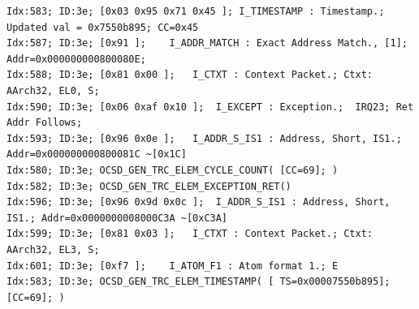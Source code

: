 \begin{latin}
\begin{lstlisting}
Idx:583; ID:3e; [0x03 0x95 0x71 0x45 ];	I_TIMESTAMP : Timestamp.; Updated val = 0x7550b895; CC=0x45
Idx:587; ID:3e; [0x91 ];	I_ADDR_MATCH : Exact Address Match., [1]; Addr=0x000000000800080E; 
Idx:588; ID:3e; [0x81 0x00 ];	I_CTXT : Context Packet.; Ctxt: AArch32, EL0, S; 
Idx:590; ID:3e; [0x06 0xaf 0x10 ];	I_EXCEPT : Exception.;  IRQ23; Ret Addr Follows;
Idx:593; ID:3e; [0x96 0x0e ];	I_ADDR_S_IS1 : Address, Short, IS1.; Addr=0x000000000800081C ~[0x1C]
Idx:580; ID:3e; OCSD_GEN_TRC_ELEM_CYCLE_COUNT( [CC=69]; )
Idx:582; ID:3e; OCSD_GEN_TRC_ELEM_EXCEPTION_RET()
Idx:596; ID:3e; [0x96 0x9d 0x0c ];	I_ADDR_S_IS1 : Address, Short, IS1.; Addr=0x0000000008000C3A ~[0xC3A]
Idx:599; ID:3e; [0x81 0x03 ];	I_CTXT : Context Packet.; Ctxt: AArch32, EL3, S; 
Idx:601; ID:3e; [0xf7 ];	I_ATOM_F1 : Atom format 1.; E
Idx:583; ID:3e; OCSD_GEN_TRC_ELEM_TIMESTAMP( [ TS=0x00007550b895];  [CC=69]; )
\end{lstlisting}
\end{latin}

